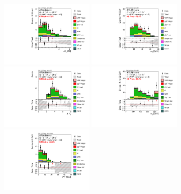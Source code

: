 \begin{figure}[hb!]
  \centering
   \includegraphics[width=0.4\textwidth]{fig/analysis/BDTinputVarsInSR/SF_SR_FitRegion_DPhill_mh125_lin.pdf}
   \includegraphics[width=0.4\textwidth]{fig/analysis/BDTinputVarsInSR/SF_SR_FitRegion_Mll_mh125_lin.pdf}
   \includegraphics[width=0.4\textwidth]{fig/analysis/BDTinputVarsInSR/SF_SR_FitRegion_DYjj_mh125_lin.pdf}
   \includegraphics[width=0.4\textwidth]{fig/analysis/BDTinputVarsInSR/SF_SR_FitRegion_Mjj_mh125_lin.pdf}
   \includegraphics[width=0.4\textwidth]{fig/analysis/BDTinputVarsInSR/SF_SR_FitRegion_Pttot_tr_mh125_lin.pdf}

\end{figure}
